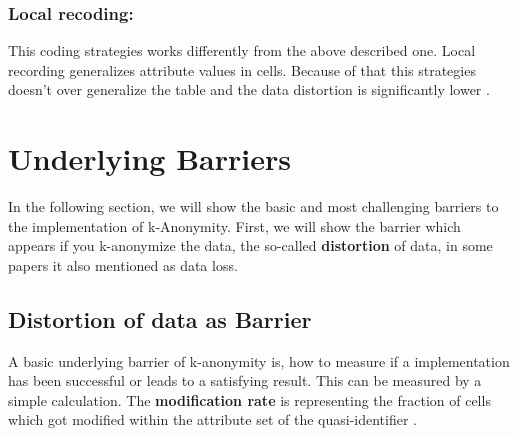 \documentclass{llncs}
\begin{document}
\subsubsection{Local recoding:}
This coding strategies works differently from the above described one. Local recording generalizes attribute values in cells. Because of that this strategies doesn't over generalize the table and the data distortion is significantly lower \cite{li2006achieving}. 

 
\section{Underlying Barriers}

In the following section, we will show the basic and most challenging barriers to the implementation of k-Anonymity. First, we will show the barrier which appears if you k-anonymize the data, the so-called \textbf{distortion} of data, in some papers it also mentioned as data loss. 
\subsection{Distortion of data as Barrier} 
A basic underlying barrier of k-anonymity is, how to measure if a implementation has been successful or leads to a satisfying result. This can be measured by a simple calculation.
The \textbf{modification rate} is representing the fraction of cells which got modified within the attribute set of the quasi-identifier \cite{li2006achieving}.
\end{document}
